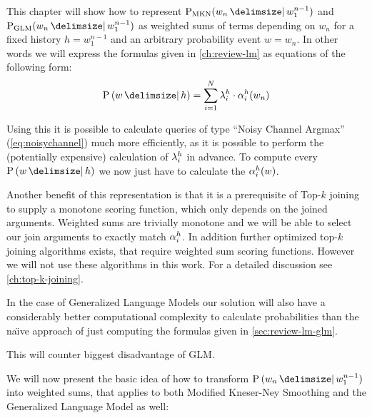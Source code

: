 

This chapter will show how to represent  $\ProbMKN{w_n}{w_1^{n-1}}$ and
$\ProbGLM{w_n}{w_1^{n-1}}$ as weighted sums of terms depending on $w_n$ for a
fixed history $h = w_1^{n-1}$ and an  arbitrary probability event $w = w_n$.
In other words we will express the formulas given in \cref{ch:review-lm} as
equations of the following form:
\begin{equation}
  \Prob{w}{h} = \sum_{i = 1}^{N} \SumWeight_i^h \cdot \SumArg_i^h(w_n)
\end{equation}

Using this it is possible to calculate queries of type ``Noisy Channel Argmax''
(\cref{eq:noisychannel}) much more efficiently, as it is possible to perform the
(potentially expensive) calculation of $\lambda_i^h$ in advance.
To compute every $\Prob{w}{h}$ we now just have to calculate the
$\alpha_i^h(w)$.

Another benefit of this representation is that it is a prerequisite of Top-$k$
joining to supply a monotone scoring function, which only depends on the
joined arguments.
Weighted sums are trivially monotone  and we will be able to
select our join arguments to exactly match $\alpha_i^h$.
In addition further optimized top-$k$ joining algorithms exists, that require
weighted sum scoring functions.
However we will not use these algorithms in this work.
For a detailed discussion see \cref{ch:top-k-joining}.

In the case of Generalized Language Models our solution will also have a
considerably better computational complexity to calculate probabilities than the
na{\"\i}ve  approach of just computing
the formulas given in
\cref{sec:review-lm-glm}.
\begin{draft}
This will counter biggest disadvantage of GLM.
\end{draft}

We will now present the basic idea of how to transform $\Prob{w_n}{w_1^{n-1}}$
into weighted sums, that applies to both Modified Kneser-Ney Smoothing and
the Generalized Language Model as well:

